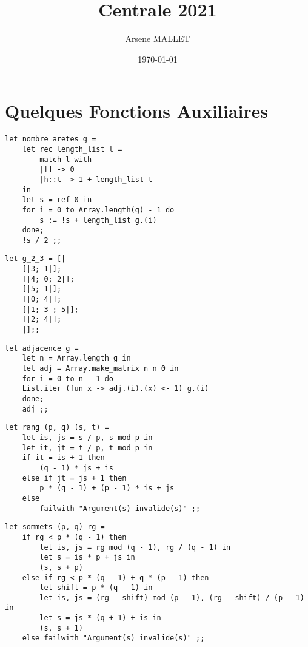 \documentclass{article}
\title{Centrale 2021}
\date{\today}
\author{Arsene MALLET}
\begin{document}
\thispagestyle{firstpage}

\begin{center}
    \huge\bfseries{\@title}
\end{center}

\section{Quelques Fonctions Auxiliaires}

\begin{question}
    \item \begin{verbatim}
let nombre_aretes g =
    let rec length_list l =
        match l with
        |[] -> 0
        |h::t -> 1 + length_list t 
    in
    let s = ref 0 in
    for i = 0 to Array.length(g) - 1 do
        s := !s + length_list g.(i)
    done;
    !s / 2 ;;
    \end{verbatim}

    \item \begin{verbatim}
let g_2_3 = [|
    [|3; 1|];
    [|4; 0; 2|];
    [|5; 1|];
    [|0; 4|];
    [|1; 3 ; 5|];
    [|2; 4|];
    |];;
    \end{verbatim}

    \item \begin{verbatim}
let adjacence g =
    let n = Array.length g in
    let adj = Array.make_matrix n n 0 in
    for i = 0 to n - 1 do
    List.iter (fun x -> adj.(i).(x) <- 1) g.(i) 
    done;
    adj ;; 
    \end{verbatim}
    
    \item \begin{verbatim}
let rang (p, q) (s, t) =
    let is, js = s / p, s mod p in
    let it, jt = t / p, t mod p in
    if it = is + 1 then
        (q - 1) * js + is
    else if jt = js + 1 then
        p * (q - 1) + (p - 1) * is + js
    else 
        failwith "Argument(s) invalide(s)" ;;
    \end{verbatim}

    \item \begin{verbatim}
let sommets (p, q) rg =
    if rg < p * (q - 1) then
        let is, js = rg mod (q - 1), rg / (q - 1) in
        let s = is * p + js in
        (s, s + p)
    else if rg < p * (q - 1) + q * (p - 1) then
        let shift = p * (q - 1) in
        let is, js = (rg - shift) mod (p - 1), (rg - shift) / (p - 1) in
        let s = js * (q + 1) + is in
        (s, s + 1)
    else failwith "Argument(s) invalide(s)" ;;
    \end{verbatim}


\end{question}
\end{document}
